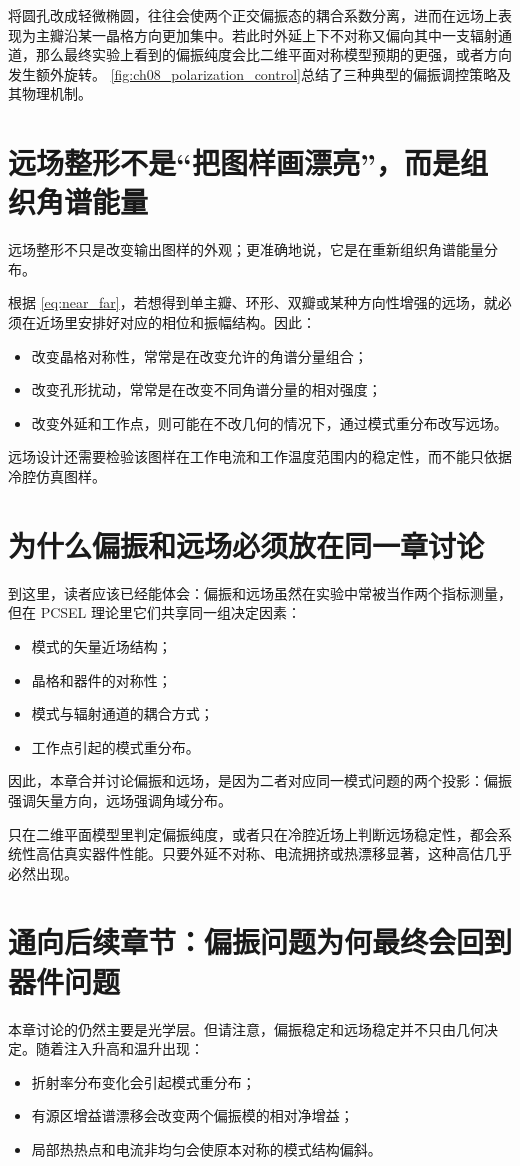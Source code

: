 将圆孔改成轻微椭圆，往往会使两个正交偏振态的耦合系数分离，进而在远场上表现为主瓣沿某一晶格方向更加集中。若此时外延上下不对称又偏向其中一支辐射通道，那么最终实验上看到的偏振纯度会比二维平面对称模型预期的更强，或者方向发生额外旋转。
\cref{fig:ch08_polarization_control}总结了三种典型的偏振调控策略及其物理机制。



\section{远场整形不是“把图样画漂亮”，而是组织角谱能量}
远场整形不只是改变输出图样的外观；更准确地说，它是在重新组织角谱能量分布。

根据 \cref{eq:near_far}，若想得到单主瓣、环形、双瓣或某种方向性增强的远场，就必须在近场里安排好对应的相位和振幅结构。因此：
\begin{itemize}
  \item 改变晶格对称性，常常是在改变允许的角谱分量组合；
  \item 改变孔形扰动，常常是在改变不同角谱分量的相对强度；
  \item 改变外延和工作点，则可能在不改几何的情况下，通过模式重分布改写远场。
\end{itemize}

远场设计还需要检验该图样在工作电流和工作温度范围内的稳定性，而不能只依据冷腔仿真图样。

\section{为什么偏振和远场必须放在同一章讨论}
到这里，读者应该已经能体会：偏振和远场虽然在实验中常被当作两个指标测量，但在 PCSEL 理论里它们共享同一组决定因素：
\begin{itemize}
  \item 模式的矢量近场结构；
  \item 晶格和器件的对称性；
  \item 模式与辐射通道的耦合方式；
  \item 工作点引起的模式重分布。
\end{itemize}

因此，本章合并讨论偏振和远场，是因为二者对应同一模式问题的两个投影：偏振强调矢量方向，远场强调角域分布。

只在二维平面模型里判定偏振纯度，或者只在冷腔近场上判断远场稳定性，都会系统性高估真实器件性能。只要外延不对称、电流拥挤或热漂移显著，这种高估几乎必然出现。

\section{通向后续章节：偏振问题为何最终会回到器件问题}
本章讨论的仍然主要是光学层。但请注意，偏振稳定和远场稳定并不只由几何决定。随着注入升高和温升出现：
\begin{itemize}
  \item 折射率分布变化会引起模式重分布；
  \item 有源区增益谱漂移会改变两个偏振模的相对净增益；
  \item 局部热热点和电流非均匀会使原本对称的模式结构偏斜。
\end{itemize}

